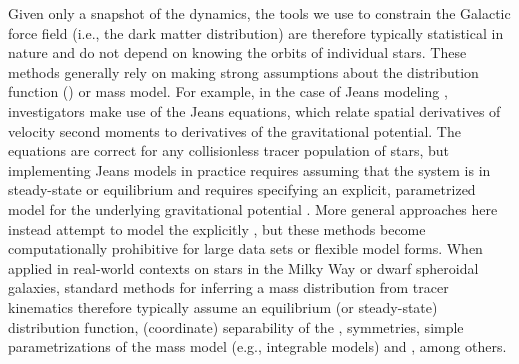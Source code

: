 \documentclass[modern]{aastex63}
\begin{document}
Given only a snapshot of the dynamics, the tools we use to constrain the
Galactic force field (i.e., the dark matter distribution) are therefore
typically statistical in nature and do not depend on knowing the orbits of
individual stars.
These methods generally rely on making strong assumptions about the distribution
function () or mass model.
For example, in the case of Jeans modeling \citep[e.g.,][]{Jeans:1922,
Oort:1932, Bahcall:1984, Romanowsky:2003, Evans:2009, Watkins:2010, Walker:2011,
Zhai:2018, Buch:2019}, investigators make use of the Jeans equations, which
relate spatial derivatives of velocity second moments to derivatives of the
gravitational potential.
The equations are correct for any collisionless tracer population of stars, but
implementing Jeans models in practice requires assuming that the system is in
steady-state or equilibrium and requires specifying an explicit, parametrized
model for the underlying gravitational potential \citep[see, e.g.,][for a review
of such methods as applied to the problem of determining the local dark matter
density]{Read:2014}.
More general approaches here instead attempt to model the 
explicitly \citep[e.g.,][]{BoHogg, McMillan:2013, Magorrian:2014, Binney:2014,
Bovy:2016, Magorrian:2019}, but these methods become computationally prohibitive
for large data sets or flexible model forms.
When applied in real-world contexts on stars in the Milky Way or dwarf
spheroidal galaxies, standard methods for inferring a mass distribution from
tracer kinematics therefore typically assume an equilibrium (or steady-state)
distribution function, (coordinate) separability of the ,
symmetries, simple parametrizations of the mass model (e.g., integrable models)
and , among others.

\end{document}
